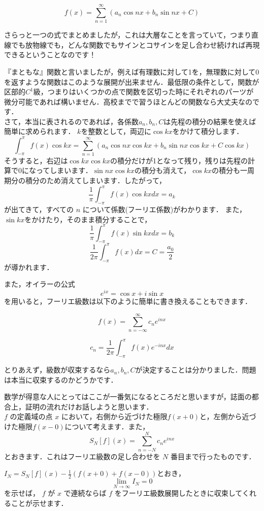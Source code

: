 \[
  f(x) = \sum_{n=1}^\infty (a_n \cos nx + b_n \sin nx + C)
\]

さらっと一つの式でまとめましたが，これは大層なことを言っていて，つまり直線でも放物線でも，どんな関数でもサインとコサインを足し合わせ続ければ再現できるということなのです！

『まともな』関数と言いましたが，例えば有理数に対して1を，無理数に対して0を返すような関数はこのような展開が出来ません．最低限の条件として，関数が区部的$C^1$級，つまりはいくつかの点で関数を区切った時にそれぞれのパーツが微分可能であれば構いません．高校までで習うほとんどの関数なら大丈夫なのです．\\

さて，本当に表されるのであれば，各係数$a_n,b_n,C$は先程の積分の結果を使えば簡単に求められます．
$k$を整数として，両辺に$\cos kx$をかけて積分します．
\[
  \int_{-\pi}^\pi f(x) \cos kx = \sum_{n=1}^\infty (a_n \cos nx \cos kx+ b_n \sin nx \cos kx + C \cos kx)
\]
そうすると，右辺は$\cos kx \cos kx$の積分だけが1となって残り，残りは先程の計算で0になってしまいます．$\sin nx \cos kx$の積分も消えて，$\cos kx$の積分も一周期分の積分のため消えてしまいます．したがって，
\[
  \frac{1}{\pi} \int_{-\pi}^\pi f(x) \cos kx dx = a_k
\]
が出てきて，すべての $n$ について係数(フーリエ係数)がわかります．
また，$\sin kx$をかけたり，そのまま積分することで，
\[
  \frac{1}{\pi} \int_{-\pi}^\pi f(x) \sin kx dx = b_k
\]
\[
  \frac{1}{2 \pi} \int_{-\pi}^\pi f(x) dx = C = \frac{a_0}{2}
\]
が導かれます．

また，オイラーの公式
\[e^{ix} = \cos x + i \sin x\]
を用いると，フーリエ級数は以下のように簡単に書き換えることもできます．

\[
  f(x) = \sum_{n=-\infty}^\infty c_n e^{inx}
\]

\[
  c_n = \frac{1}{2\pi} \int_{-\pi}^\pi f(x) e^{-inx} dx
\]

とりあえず，級数が収束するなら$a_n,b_n,C$が決定することは分かりました．問題は本当に収束するのかどうかです．

数学が得意な人にとってはここが一番気になるところだと思いますが，誌面の都合上，証明の流れだけお話しようと思います．\\

$f$ の定義域の点 $x$ において，右側から近づけた極限$f(x+0)$と，左側から近づけた極限$f(x-0)$について考えます．また，
\[
  S_N[f](x) = \sum_{n=-N}^N c_n e^{inx}
\]
とおきます．これはフーリエ級数の足し合わせを $N$ 番目まで行ったものです．

$I_N = S_N[f](x) - \frac{1}{2}(f(x+0)+f(x-0))$とおき，
\[
  \lim_{N \to \infty} I_N = 0
\]
を示せば， $f$ が $x$ で連続ならば $f$ をフーリエ級数展開したときに収束してくれることが示せます．


